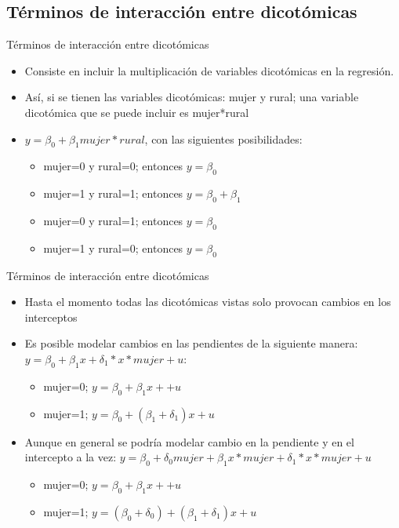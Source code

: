 \subsection{Términos de interacción entre dicotómicas}
\begin{frame}{Términos de interacción entre dicotómicas}
	\begin{itemize}
		\item Consiste en incluir la multiplicación de variables dicotómicas en la regresión.
		\pause
		\item Así, si se tienen las variables dicotómicas: mujer y rural; una variable dicotómica que se puede incluir es mujer*rural
		\pause
		\item $y=\beta_{0}+\beta_{1}mujer*rural$, con las siguientes posibilidades:
		\pause
		\begin{itemize}
			\item mujer=0 y rural=0; entonces $y=\beta_{0}$
			\item mujer=1 y rural=1; entonces $y=\beta_{0}+\beta_{1}$
			\item mujer=0 y rural=1; entonces $y=\beta_{0}$
			\item mujer=1 y rural=0; entonces $y=\beta_{0}$
		\end{itemize}
	\end{itemize}
\end{frame}
\begin{frame}{Términos de interacción entre dicotómicas}
	\begin{itemize}
		\item Hasta el momento todas las dicotómicas vistas solo provocan cambios en los interceptos
		\pause
		\item Es posible modelar cambios en las pendientes de la siguiente manera: $y=\beta_{0}+\beta_{1}x+\delta_{1}*x*mujer+u$:
		\begin{itemize}
			\item mujer=0; $y=\beta_{0}+\beta_{1}x++u$
			\item mujer=1; $y=\beta_{0}+(\beta_{1}+\delta_{1})x+u$
		\end{itemize}
		\pause
		\item Aunque en general se podrí­a modelar cambio en la pendiente y en el intercepto a la vez: $y=\beta_{0}+\delta_{0}mujer+\beta_{1}x*mujer+\delta_{1}*x*mujer+u$
		\begin{itemize}
			\item mujer=0; $y=\beta_{0}+\beta_{1}x++u$
			\item mujer=1; $y=(\beta_{0}+\delta_{0})+(\beta_{1}+\delta_{1})x+u$
		\end{itemize}
	\end{itemize}
\end{frame}
